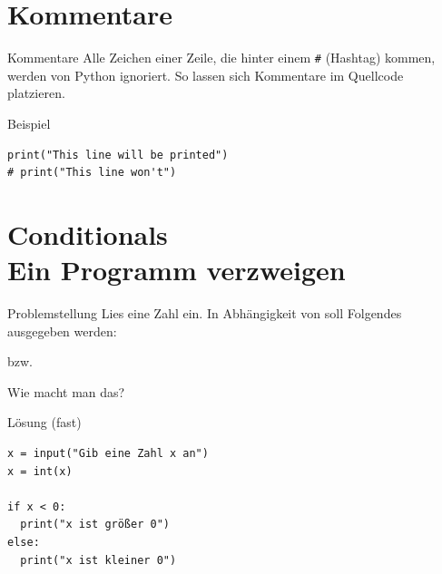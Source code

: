 \section{Kommentare}

\begin{fragile}


\begin{block}{Kommentare}
\vspace{2pt}
Alle Zeichen einer Zeile, die hinter einem \texttt{\#} (Hashtag) kommen, werden von Python ignoriert.
So lassen sich Kommentare im Quellcode platzieren. 
\end{block}

\vspace{12pt}

\pause
\begin{exampleblock}{Beispiel}
\begin{verbatim}
print("This line will be printed")
# print("This line won't") 
\end{verbatim}
\end{exampleblock}

\end{fragile}



\section{Conditionals \\ \footnotesize Ein Programm verzweigen}

\begin{frame}
	\begin{block}{Problemstellung}
		\vspace{2pt}
		Lies eine Zahl  ein. In Abhängigkeit von  soll Folgendes ausgegeben werden: 
		
		
		bzw. 
		
		\vspace{8pt}
		
		
		Wie macht man das?
		\end{block}
\end{frame}

\begin{fragile}
	
\begin{block}{Lösung \footnotesize(fast)}
\begin{verbatim}
x = input("Gib eine Zahl x an")
x = int(x)

if x < 0:
  print("x ist größer 0")
else:
  print("x ist kleiner 0")
\end{verbatim}
\end{block}
	
\end{fragile}


